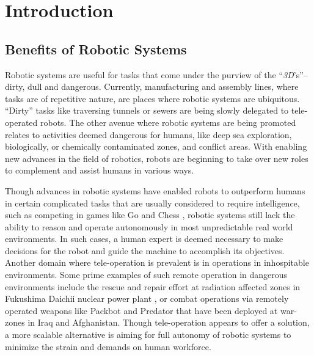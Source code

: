 
\chapter{Introduction}
\label{chap:thesis_intro}

\section{Benefits of Robotic Systems}

Robotic systems are useful for tasks that come under the purview of the ``\emph{3D}'s''--dirty, dull and dangerous. 
Currently, manufacturing and assembly lines, where tasks are of repetitive nature, are places where robotic systems are ubiquitous. ``Dirty'' tasks like traversing tunnels or sewers are being slowly delegated to tele-operated robots. 
The other avenue where robotic systems are being promoted relates to activities deemed dangerous for humans, like deep sea exploration, biologically, or chemically contaminated zones, and conflict areas. With enabling new advances in the field of robotics, robots are beginning to take over new roles to complement and assist humans in various ways.

Though advances in robotic systems have enabled robots to outperform humans in certain complicated tasks that are usually considered to require intelligence, such as competing in games like Go \cite{deepmind} and Chess \cite{deepblue}, 
robotic systems still lack the ability to reason and operate
autonomously in most unpredictable real world environments. 
In such cases, a human expert is deemed necessary to make decisions for the robot and guide the machine
to accomplish its objectives. Another domain where tele-operation is prevalent is in operations in inhospitable environments. Some prime examples of such remote operation in
dangerous environments include the rescue and repair effort at radiation affected zones in Fukushima Daichii nuclear power plant \cite{fukushima}, or combat operations via remotely operated weapons like Packbot \cite{packbot} and Predator \cite{predator} that have been deployed
at war-zones in Iraq and Afghanistan. Though tele-operation appears to offer a solution, a more scalable alternative
is aiming for full autonomy of robotic systems to minimize the strain and demands on human workforce.

